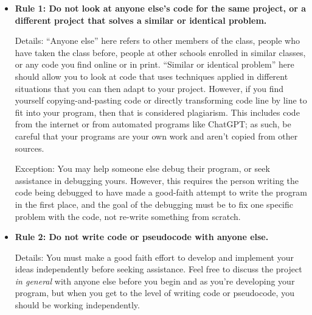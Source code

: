 \documentclass [letterpaper,11pt]{article}
\begin{document}
\begin{description}
\begin{itemize}
        \begin{itemize}
                \item \textbf{Rule 1: Do not look at anyone else's code for the same project, or a different project that solves a similar 
                or identical problem.}
                
                Details: ``Anyone else'' here refers to other members of the class, people who have taken the class before, people at other
                schools enrolled in similar classes, or any code you find online or in print.  ``Similar or identical problem'' here should 
                allow you to look at code that uses techniques applied in different situations that you can then 
                adapt to your project.  However, if you find yourself copying-and-pasting code or directly transforming
                code line by line to fit into your program, then that is considered plagiarism.  This includes code from the internet or from automated programs like ChatGPT; as such, be careful that your programs are your own work and aren't copied from other sources.\newline
                              
                Exception: You may help someone else debug their program, or seek assistance in debugging yours.  However, 
                this requires the person writing the code being debugged to have made a good-faith attempt
                to write the program in the first place, and the goal of the debugging must be to fix
                one specific problem with the code, not re-write something from scratch.\newline
                
                \item \textbf{Rule 2: Do not write code or pseudocode with anyone else.}
                
                Details: You must make a good faith effort to develop and implement your ideas
                independently before seeking assistance.  Feel free to discuss the project \emph{in general} with anyone else
                before you begin and as you're developing your program, but when you get to the level of writing code or
                pseudocode, you should be working independently.
                
                        \end{itemize}
        \end{itemize}


\end{description}
\end{document}
